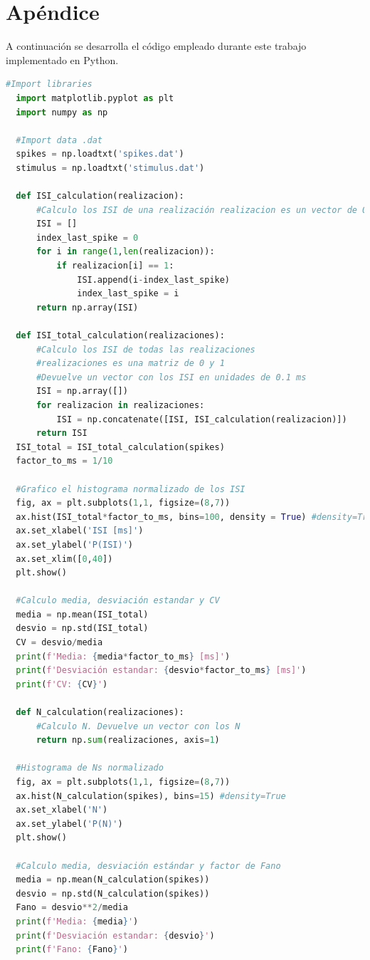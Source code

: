 \documentclass[aps,prb,twocolumn,superscriptaddress,floatfix,longbibliography]{revtex4-2}
\begin{document}
\onecolumngrid

\section{Apéndice}
A continuación se desarrolla el código empleado durante este trabajo implementado en Python.

\begin{lstlisting}[language=Python]
  #Import libraries
  import matplotlib.pyplot as plt
  import numpy as np
  
  #Import data .dat
  spikes = np.loadtxt('spikes.dat')
  stimulus = np.loadtxt('stimulus.dat')
  
  def ISI_calculation(realizacion):
      #Calculo los ISI de una realización realizacion es un vector de 0 y 1. Devuelve un vector con los ISI en unidades de 0.1 ms
      ISI = []
      index_last_spike = 0
      for i in range(1,len(realizacion)):
          if realizacion[i] == 1:
              ISI.append(i-index_last_spike)
              index_last_spike = i
      return np.array(ISI)
  
  def ISI_total_calculation(realizaciones):
      #Calculo los ISI de todas las realizaciones
      #realizaciones es una matriz de 0 y 1
      #Devuelve un vector con los ISI en unidades de 0.1 ms
      ISI = np.array([])
      for realizacion in realizaciones:
          ISI = np.concatenate([ISI, ISI_calculation(realizacion)])
      return ISI
  ISI_total = ISI_total_calculation(spikes)
  factor_to_ms = 1/10
  
  #Grafico el histograma normalizado de los ISI
  fig, ax = plt.subplots(1,1, figsize=(8,7))
  ax.hist(ISI_total*factor_to_ms, bins=100, density = True) #density=True
  ax.set_xlabel('ISI [ms]')
  ax.set_ylabel('P(ISI)')
  ax.set_xlim([0,40])
  plt.show()
  
  #Calculo media, desviación estandar y CV
  media = np.mean(ISI_total)
  desvio = np.std(ISI_total)
  CV = desvio/media
  print(f'Media: {media*factor_to_ms} [ms]')
  print(f'Desviación estandar: {desvio*factor_to_ms} [ms]')
  print(f'CV: {CV}')
  
  def N_calculation(realizaciones):
      #Calculo N. Devuelve un vector con los N
      return np.sum(realizaciones, axis=1)
  
  #Histograma de Ns normalizado
  fig, ax = plt.subplots(1,1, figsize=(8,7))
  ax.hist(N_calculation(spikes), bins=15) #density=True
  ax.set_xlabel('N')
  ax.set_ylabel('P(N)')
  plt.show()
  
  #Calculo media, desviación estándar y factor de Fano
  media = np.mean(N_calculation(spikes))
  desvio = np.std(N_calculation(spikes))
  Fano = desvio**2/media
  print(f'Media: {media}')
  print(f'Desviación estandar: {desvio}')
  print(f'Fano: {Fano}')
  

\end{lstlisting}
\end{document}
